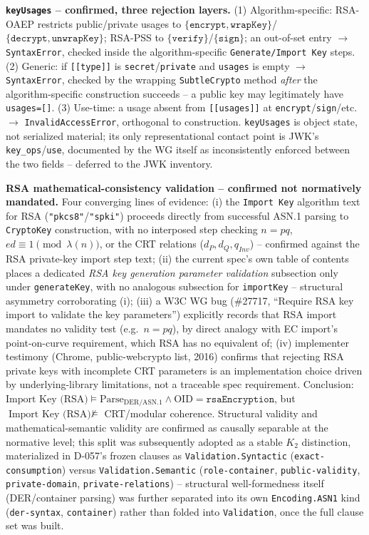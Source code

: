 \documentclass[11pt,a4paper]{article}
\begin{document}
\textbf{\texttt{keyUsages} -- confirmed, three rejection layers.} (1) Algorithm-specific: RSA-OAEP restricts public/private usages to $\{\texttt{encrypt},\texttt{wrapKey}\}$/$\{\texttt{decrypt},\texttt{unwrapKey}\}$; RSA-PSS to $\{\texttt{verify}\}$/$\{\texttt{sign}\}$; an out-of-set entry $\to$ \texttt{SyntaxError}, checked inside the algorithm-specific \texttt{Generate/Import Key} steps. (2) Generic: if \texttt{[[type]]} is \texttt{secret}/\texttt{private} and \texttt{usages} is empty $\to$ \texttt{SyntaxError}, checked by the wrapping \texttt{SubtleCrypto} method \emph{after} the algorithm-specific construction succeeds -- a public key may legitimately have \texttt{usages=[]}. (3) Use-time: a usage absent from \texttt{[[usages]]} at \texttt{encrypt}/\texttt{sign}/etc.\ $\to$ \texttt{InvalidAccessError}, orthogonal to construction. \texttt{keyUsages} is object state, not serialized material; its only representational contact point is JWK's \texttt{key\_ops}/\texttt{use}, documented by the WG itself as inconsistently enforced between the two fields -- deferred to the JWK inventory.

\textbf{RSA mathematical-consistency validation -- confirmed not normatively mandated.} Four converging lines of evidence: (i) the \texttt{Import Key} algorithm text for RSA (\texttt{"pkcs8"}/\texttt{"spki"}) proceeds directly from successful ASN.1 parsing to \texttt{CryptoKey} construction, with no interposed step checking $n=pq$, $ed\equiv 1\pmod{\lambda(n)}$, or the CRT relations ($d_P,d_Q,q_{Inv}$) -- confirmed against the RSA private-key import step text; (ii) the current spec's own table of contents places a dedicated \emph{RSA key generation parameter validation} subsection only under \texttt{generateKey}, with no analogous subsection for \texttt{importKey} -- structural asymmetry corroborating (i); (iii) a W3C WG bug (\#27717, ``Require RSA key import to validate the key parameters'') explicitly records that RSA import mandates no validity test (e.g.\ $n=pq$), by direct analogy with EC import's point-on-curve requirement, which RSA has no equivalent of; (iv) implementer testimony (Chrome, public-webcrypto list, 2016) confirms that rejecting RSA private keys with incomplete CRT parameters is an implementation choice driven by underlying-library limitations, not a traceable spec requirement. Conclusion: $\text{Import Key (RSA)} \models \text{Parse}_{\text{DER/ASN.1}} \wedge \text{OID}=\texttt{rsaEncryption}$, but $\text{Import Key (RSA)} \not\models$ CRT/modular coherence. Structural validity and mathematical-semantic validity are confirmed as causally separable at the normative level; this split was subsequently adopted as a stable $K_2$ distinction, materialized in D-057's frozen clauses as \texttt{Validation.Syntactic} (\texttt{exact-consumption}) versus \texttt{Validation.Semantic} (\texttt{role-container}, \texttt{public-validity}, \texttt{private-domain}, \texttt{private-relations}) -- structural well-formedness itself (DER/container parsing) was further separated into its own \texttt{Encoding.ASN1} kind (\texttt{der-syntax}, \texttt{container}) rather than folded into \texttt{Validation}, once the full clause set was built.
\end{document}
